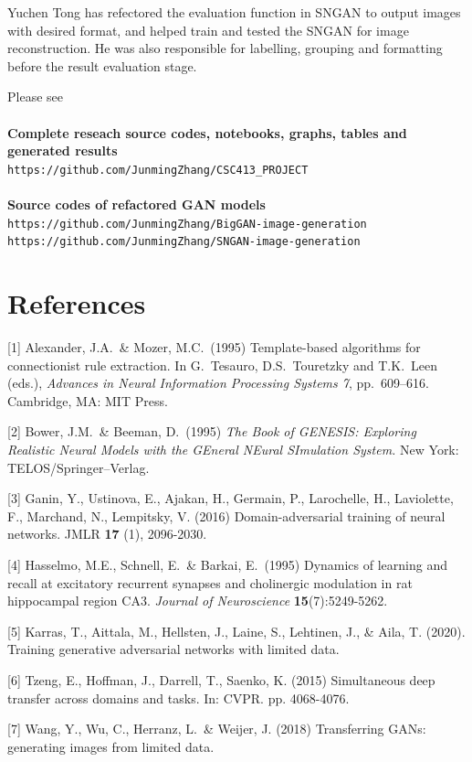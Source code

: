 \documentclass{article}
\begin{document}
    Yuchen Tong has refectored the evaluation function in SNGAN to output images with desired format, and helped train and tested the SNGAN for image reconstruction. He was also responsible for labelling, grouping and formatting before the result evaluation stage.
    
    Please see \\\\
    \textbf{Complete reseach source codes, notebooks, graphs, tables and generated results} \\
    \texttt{https://github.com/JunmingZhang/CSC413\_PROJECT} \\\\
    \textbf{Source codes of refactored GAN models} \\ \texttt{https://github.com/JunmingZhang/BigGAN-image-generation} \\ \texttt{https://github.com/JunmingZhang/SNGAN-image-generation}

\newpage
\section*{References}
[1] Alexander, J.A.\ \& Mozer, M.C.\ (1995) Template-based algorithms for
connectionist rule extraction. In G.\ Tesauro, D.S.\ Touretzky and T.K.\ Leen
(eds.), {\it Advances in Neural Information Processing Systems 7},
pp.\ 609--616. Cambridge, MA: MIT Press.

[2] Bower, J.M.\ \& Beeman, D.\ (1995) {\it The Book of GENESIS: Exploring
  Realistic Neural Models with the GEneral NEural SImulation System.}  New York:
TELOS/Springer--Verlag.

[3] Ganin, Y., Ustinova, E., Ajakan, H., Germain, P., Larochelle, H., Laviolette, F., Marchand, N., Lempitsky, V. (2016) Domain-adversarial training of neural networks. JMLR {\bf{17}} (1), 2096-2030.

[4] Hasselmo, M.E., Schnell, E.\ \& Barkai, E.\ (1995) Dynamics of learning and
recall at excitatory recurrent synapses and cholinergic modulation in rat
hippocampal region CA3. {\it Journal of Neuroscience} {\bf 15}(7):5249-5262.

[5] Karras, T., Aittala, M., Hellsten, J., Laine, S., Lehtinen, J., \& Aila, T. (2020). Training generative adversarial networks with limited data.

[6] Tzeng, E., Hoffman, J., Darrell, T., Saenko, K. (2015) Simultaneous deep transfer across domains and tasks. In: CVPR. pp. 4068-4076.

[7] Wang, Y., Wu, C., Herranz, L.\ \&  Weijer, J. (2018) Transferring GANs: generating images from limited data.
\end{document}
